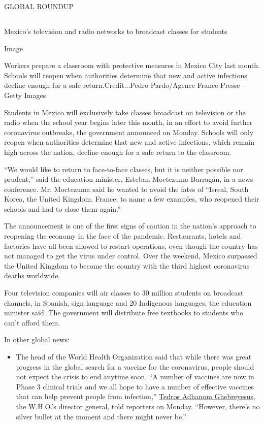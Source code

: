 GLOBAL ROUNDUP

\hypertarget{-9}{%
\subsection{}\label{-9}}

Mexico's television and radio networks to broadcast classes for students

Image

Workers prepare a classroom with protective measures in Mexico City last
month. Schools will reopen when authorities determine that new and
active infections decline enough for a safe return.Credit...Pedro
Pardo/Agence France-Presse --- Getty Images

Students in Mexico will exclusively take classes broadcast on television
or the radio when the school year begins later this month, in an effort
to avoid further coronavirus outbreaks, the government announced on
Monday. Schools will only reopen when authorities determine that new and
active infections, which remain high across the nation, decline enough
for a safe return to the classroom.

``We would like to return to face-to-face classes, but it is neither
possible nor prudent,'' said the education minister, Esteban Moctezuma
Barragán, in a news conference. Mr. Moctezuma said he wanted to avoid
the fates of ``Isreal, South Korea, the United Kingdom, France, to name
a few examples, who reopened their schools and had to close them
again.''

The announcement is one of the first signs of caution in the nation's
approach to reopening the economy in the face of the pandemic.
Restaurants, hotels and factories have all been allowed to restart
operations, even though the country has not managed to get the virus
under control. Over the weekend, Mexico surpassed the United Kingdom to
become the country with the third highest coronavirus deaths worldwide.

Four television companies will air classes to 30 million students on
broadcast channels, in Spanish, sign language and 20 Indigenous
languages, the education minister said. The government will distribute
free textbooks to students who can't afford them.

In other global news:

\begin{itemize}
\tightlist
\item
  The head of the World Health Organization said that while there was
  great progress in the global search for a vaccine for the coronavirus,
  people should not expect the crisis to end anytime soon. ``A number of
  vaccines are now in Phase 3 clinical trials and we all hope to have a
  number of effective vaccines that can help prevent people from
  infection,'' \href{https://twitter.com/DrTedros}{Tedros Adhanom
  Ghebreyesus}, the W.H.O.'s director general, told reporters on Monday.
  ``However, there's no silver bullet at the moment and there might
  never be.''
\end{itemize}


